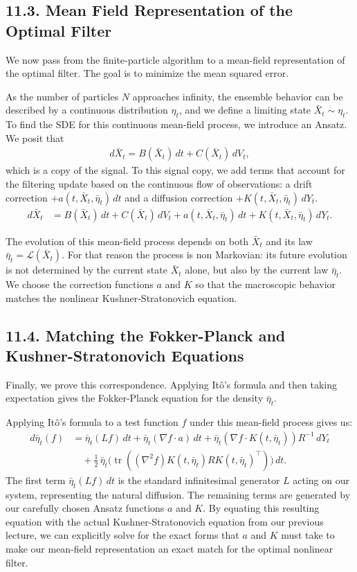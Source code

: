 \documentclass[11pt]{article}
\theoremstyle{definition}
\theoremstyle{remark}
\begin{document}
\subsection*{11.3. Mean Field Representation of the Optimal Filter}
We now pass from the finite-particle algorithm to a mean-field representation of the optimal filter. The goal is to minimize the mean squared error.

As the number of particles $N$ approaches infinity, the ensemble behavior can be described by a continuous distribution $\eta_t$, and we define a limiting state $\bar X_t\sim \eta_t$. To find the SDE for this continuous mean-field process, we introduce an Ansatz. We posit that
\begin{align*}
d\bar X_t=B(\bar X_t)\,dt+C(\bar X_t)\,dV_t,
\end{align*}
which is a copy of the signal. To this signal copy, we add terms that account for the filtering update based on the continuous flow of observations: a drift correction $+a(t,\bar X_t,\bar\eta_t)\,dt$ and a diffusion correction $+K(t,\bar X_t,\bar\eta_t)\,dY_t$.
\begin{align*}
d\bar X_t
&=B(\bar X_t)\,dt+C(\bar X_t)\,dV_t+a(t,\bar X_t,\bar\eta_t)\,dt+K(t,\bar X_t,\bar\eta_t)\,dY_t.
\end{align*}

The evolution of this mean-field process depends on both $\bar X_t$ and its law $\bar\eta_t=\mathcal L(\bar X_t)$. For that reason the process is non Markovian: its future evolution is not determined by the current state $\bar X_t$ alone, but also by the current law $\bar\eta_t$. We choose the correction functions $a$ and $K$ so that the macroscopic behavior matches the nonlinear Kushner-Stratonovich equation.

\subsection*{11.4. Matching the Fokker-Planck and Kushner-Stratonovich Equations}
Finally, we prove this correspondence. Applying It\^o's formula and then taking expectation gives the Fokker-Planck equation for the density $\bar\eta_t$.

Applying It\^o's formula to a test function $f$ under this mean-field process gives us:
\begin{align*}
d\bar\eta_t(f)
&=\bar\eta_t(Lf)\,dt+\bar\eta_t(\nabla f\cdot a)\,dt+\bar\eta_t(\nabla f\cdot K(t,\bar\eta_t))R^{-1}\,dY_t \\
&\quad +\frac12\,\bar\eta_t\bigl(\operatorname{tr}((\nabla^2 f)K(t,\bar\eta_t)RK(t,\bar\eta_t)^\top)\bigr)\,dt.
\end{align*}
The first term $\bar\eta_t(Lf)\,dt$ is the standard infinitesimal generator $L$ acting on our system, representing the natural diffusion. The remaining terms are generated by our carefully chosen Ansatz functions $a$ and $K$. By equating this resulting equation with the actual Kushner-Stratonovich equation from our previous lecture, we can explicitly solve for the exact forms that $a$ and $K$ must take to make our mean-field representation an exact match for the optimal nonlinear filter.
\end{document}
